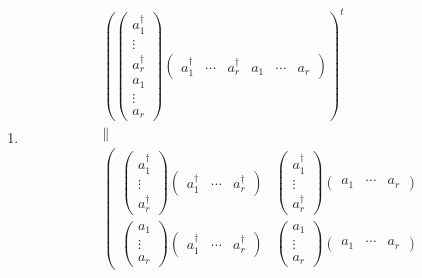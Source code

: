 \documentclass[aps,preprint]{revtex4}
\begin{document}
\begin{enumerate}
\begin{enumerate}
\begin{enumerate}
\item 
\begin{gather}
\left( \left( 
\begin{array}{c}
a_{1}^{\dagger } \\ 
\vdots \\ 
a_{r}^{\dagger } \\ 
a_{1} \\ 
\vdots \\ 
a_{r}%
\end{array}%
\right) \left( 
\begin{array}{cccccc}
a_{1}^{\dagger } & \cdots & a_{r}^{\dagger } & a_{1} & \cdots & a_{r}%
\end{array}%
\right) \right) ^{t} \\
\parallel \\
\left( 
\begin{array}{cc}
\left( 
\begin{array}{c}
a_{1}^{\dagger } \\ 
\vdots \\ 
a_{r}^{\dagger }%
\end{array}%
\right) \left( 
\begin{array}{ccc}
a_{1}^{\dagger } & \cdots & a_{r}^{\dagger }%
\end{array}%
\right) & \left( 
\begin{array}{c}
a_{1}^{\dagger } \\ 
\vdots \\ 
a_{r}^{\dagger }%
\end{array}%
\right) \left( 
\begin{array}{ccc}
a_{1} & \cdots & a_{r}%
\end{array}%
\right) \\ 
\left( 
\begin{array}{c}
a_{1} \\ 
\vdots \\ 
a_{r}%
\end{array}%
\right) \left( 
\begin{array}{ccc}
a_{1}^{\dagger } & \cdots & a_{r}^{\dagger }%
\end{array}%
\right) & \left( 
\begin{array}{c}
a_{1} \\ 
\vdots \\ 
a_{r}%
\end{array}%
\right) \left( 
\begin{array}{ccc}
a_{1} & \cdots & a_{r}%
\end{array}%
\right)%
\end{array}%

\end{gather}
\end{enumerate}
\end{enumerate}
\end{enumerate}
\end{document}
